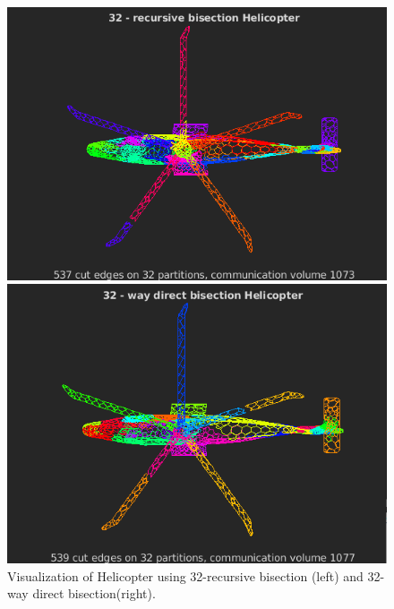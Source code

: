 \documentclass[unicode,11pt,a4paper,oneside,numbers=endperiod,openany]{scrartcl}
\begin{document}
 \begin{figure}[h!]
  \begin{minipage}[c]{0.46\linewidth}
        \centering
        \includegraphics[width=0.8\linewidth]{./img/figure31.png}
    \end{minipage}
    \hfill%
    \begin{minipage}[c]{0.46\linewidth}
        \centering
        \includegraphics[width=0.8\linewidth]{./img/figure32.png}
    \end{minipage}
  \caption{Visualization of Helicopter using 32-recursive bisection (left) and 32-way direct bisection(right).}
  \label{fig:Another tiny Web}
\end{figure}
\end{document}
